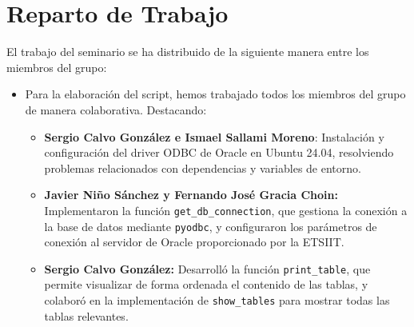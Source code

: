 \section{Reparto de Trabajo}

El trabajo del seminario se ha distribuido de la siguiente manera entre los miembros del grupo:

\begin{itemize}
    \item Para la elaboración del script, hemos trabajado todos los miembros del grupo de manera colaborativa. Destacando:
    \begin{itemize}

        \item \textbf{Sergio Calvo González e Ismael Sallami Moreno}: Instalación y configuración del driver ODBC de Oracle en Ubuntu 24.04, resolviendo problemas relacionados con dependencias y variables de entorno.
                
        \item \textbf{Javier Niño Sánchez y Fernando José Gracia Choin:} Implementaron la función \texttt{get\_db\_connection}, que gestiona la conexión a la base de datos mediante \texttt{pyodbc}, y configuraron los parámetros de conexión al servidor de Oracle proporcionado por la ETSIIT.

        \item \textbf{Sergio Calvo González:} Desarrolló la función \texttt{print\_table}, que permite visualizar de forma ordenada el contenido de las tablas, y colaboró en la implementación de \texttt{show\_tables} para mostrar todas las tablas relevantes.


\end{itemize}
\end{itemize}
